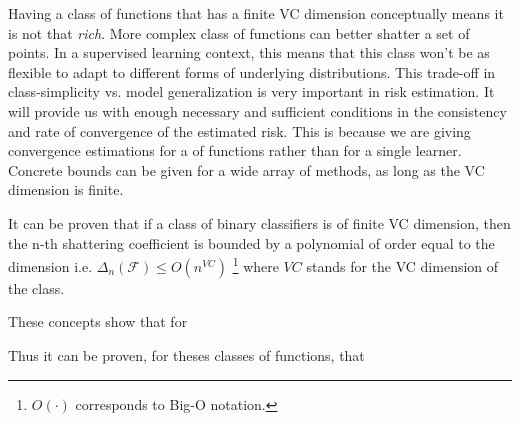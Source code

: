 Having a class of functions that has a finite VC dimension conceptually means it is not that \textit{rich}. More complex class of functions can better shatter a set of points.
In a supervised learning context, this means that this class won't be as flexible to adapt to different forms of underlying distributions. This trade-off in class-simplicity vs. model generalization is very important in risk estimation. It will provide us with enough necessary and sufficient conditions in the consistency and rate of convergence of the estimated risk. This is because we are giving convergence estimations for a  of functions rather than for a single learner. Concrete bounds can be given for a wide array of methods, as long as the VC dimension is finite.

It can be proven that if a class of binary classifiers is of finite VC dimension, then the n-th shattering coefficient is bounded by a polynomial of order equal to the dimension 
i.e. $\Delta_n(\mathcal {F}) \leq O(n^{VC})$ \footnote{$O(\cdot)$ corresponds to Big-O notation.} where $VC$ stands for the VC dimension of the class.

These concepts show that for

Thus it can be proven, for theses classes of functions, that



